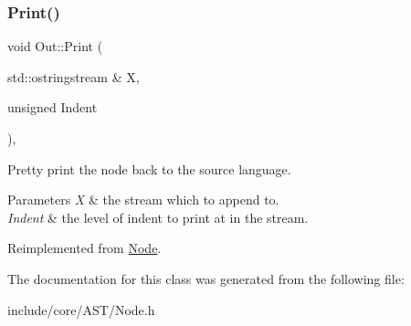 \subsubsection{\texorpdfstring{Print()}{Print()}}
{\footnotesize\ttfamily void Out\+::\+Print (\begin{DoxyParamCaption}\item[{std\+::ostringstream \&}]{X,  }\item[{unsigned}]{Indent }\end{DoxyParamCaption})\hspace{0.3cm}{\ttfamily [override]}, {\ttfamily [virtual]}}

Pretty print the node back to the source language. 
\begin{DoxyParams}{Parameters}
{\em X} & the stream which to append to. \\
\hline
{\em Indent} & the level of indent to print at in the stream. \\
\hline
\end{DoxyParams}


Reimplemented from \mbox{\hyperlink{class_node_a5325b760a6e6fe94227c0cff53af2c45}{Node}}.



The documentation for this class was generated from the following file\+:\begin{DoxyCompactItemize}
\item 
include/core/\+A\+S\+T/Node.\+h\end{DoxyCompactItemize}
